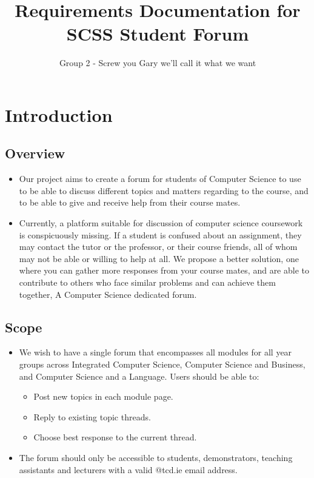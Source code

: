 \documentclass[a4paper, 12pt]{article}
\begin{document}
\title{Requirements Documentation for SCSS Student Forum}
\author{Group 2 - Screw you Gary we'll call it what we want}
\maketitle
	\section{Introduction}
		\subsection{Overview}
			\begin{itemize}
				\item Our project aims to create a forum for students of 
				Computer Science to use to be able to discuss different topics 
				and matters regarding to the course, and to be able to give 
				and receive help from their course mates.
				\item Currently, a platform suitable for discussion 
				of computer science coursework is conspicuously missing. 
				If a student is confused about an assignment, they may 
				contact the tutor or the professor, or their course friends, 
				all of whom may not be able or willing to help at all. 
				We propose a better solution, one where you can gather more 
				responses from your course mates, and are able to contribute 
				to others who face similar problems and can achieve them 
				together, A Computer Science dedicated forum.
			\end{itemize}
		\subsection{Scope}
			\begin{itemize}
				\item We wish to have a single forum that encompasses all modules 
				for all year groups across Integrated Computer Science, Computer 
				Science and Business, and Computer Science and a Language. Users should be able to:
				\begin{itemize}
					
					\item Post new topics in each module page.
					\item Reply to existing topic threads.
					\item Choose best response to the current thread.
				\end{itemize}
				\item The forum should only be accessible to students, demonstrators, 
				teaching assistants and lecturers with a valid @tcd.ie email address.
			\end{itemize}
\end{document}
